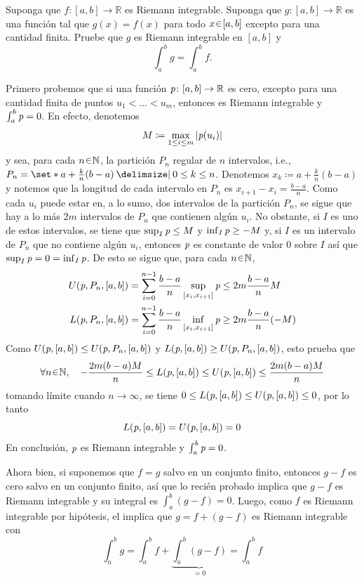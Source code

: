 \setcounter{eje}{5} %
\begin{ejer}
Suponga que $f\colon [a, b] \to \mathbb{R}$ es Riemann integrable. Suponga que $g\colon [a, b] \to \mathbb{R}$ es una función tal que $g(x) = f(x)$ para todo $x \en [a, b]$ excepto para una cantidad finita. Pruebe que $g$ es Riemann integrable en $[a, b]$ y
$$
\int_a^b g = \int_a^b f.
$$
\end{ejer}
\begin{sol}
Primero probemos que si una función $\operatorname{\textit{p}} \colon [a,b] \to \mathbb{R}$ es cero, excepto para una cantidad finita de puntos $u_1 < \dots < u_m$, entonces es Riemann integrable y $\int^b_a\operatorname{\textit{p}} = 0$. En efecto, denotemos 
\[
M \coloneq \max_{1\leq i \leq m} \abs{\operatorname{\textit{p}}(u_i)}
\]
y sea, para cada $n\en\mathbb{N}$, la partición $P_n$ regular de $n$ intervalos, i.e., $P_n = \set*{a + \frac{k}{n}(b-a) \given 0 \leq k \leq n}$. Denotemos $x_k \coloneq a + \frac{k}{n}(b-a)$ y notemos que la longitud de cada intervalo en $P_n$ es $x_{i+1} - x_i = \frac{b-a}{n}$. Como cada $u_i$ puede estar en, a lo sumo, dos intervalos de la partición $P_n$, se sigue que hay a lo más $2m$ intervalos de $P_n$ que contienen algún $u_i$. No obstante, si $I$ es uno de estos intervalos, se tiene que $\sup_I \operatorname{\textit{p}} \leq M$ y $\inf_I \operatorname{\textit{p}} \geq -M$ y, si $I$ es un intervalo de $P_n$ que no contiene algún $u_i$, entonces $\operatorname{\textit{p}}$ es constante de valor $0$ sobre $I$ así que $\sup_I \operatorname{\textit{p}} = 0 = \inf_I \operatorname{\textit{p}}$. De esto se sigue que, para cada $n\en\mathbb{N}$,
\begin{align*}
U(\operatorname{\textit{p}},P_n,[a,b]) &= \sum^{n-1}_{i=0}\frac{b-a}{n}\sup_{[x_i,x_{i+1}]} \operatorname{\textit{p}} \leq 2m\frac{b-a}{n}M\\
L(\operatorname{\textit{p}},P_n,[a,b]) &= \sum^{n-1}_{i=0}\frac{b-a}{n}\inf_{[x_i,x_{i+1}]} \operatorname{\textit{p}} \geq 2m\frac{b-a}{n}(-M)
\end{align*}
Como $U(\operatorname{\textit{p}},[a,b]) \leq U(\operatorname{\textit{p}},P_n,[a,b])$ y $L(\operatorname{\textit{p}},[a,b]) \geq U(\operatorname{\textit{p}},P_n,[a,b])$, esto prueba que
\[
\forall n\en\mathbb{N},\quad
-\frac{2m(b-a)M}{n} \leq L(\p,[a,b])\leq U(\p,[a,b]) \leq \frac{2m(b-a)M}{n}
\]
tomando límite cuando $n\to\infty$, se tiene $0\leq L(\operatorname{\textit{p}},[a,b])\leq U(\operatorname{\textit{p}},[a,b]) \leq0$, por lo tanto
\[
L(\operatorname{\textit{p}},[a,b]) = U(\operatorname{\textit{p}},[a,b]) = 0
\]
En conclusión, $\operatorname{\textit{p}}$ es Riemann integrable y $\int^b_a\operatorname{\textit{p}} = 0$.\par
Ahora bien, si suponemos que $f=g$ salvo en un conjunto finito, entonces $g-f$ es cero salvo en un conjunto finito, así que lo recién probado implica que $g-f$ es Riemann integrable y su integral es $\int^b_a(g-f) = 0$. Luego, como $f$ es Riemann integrable por hipótesis, el  implica que $g = f + (g-f)$ es Riemann integrable con
\[
\int^b_ag = \int^b_a f + \underbrace{\int^b_a(g-f)}_{=0} = \int^b_af
\]
\end{sol}

